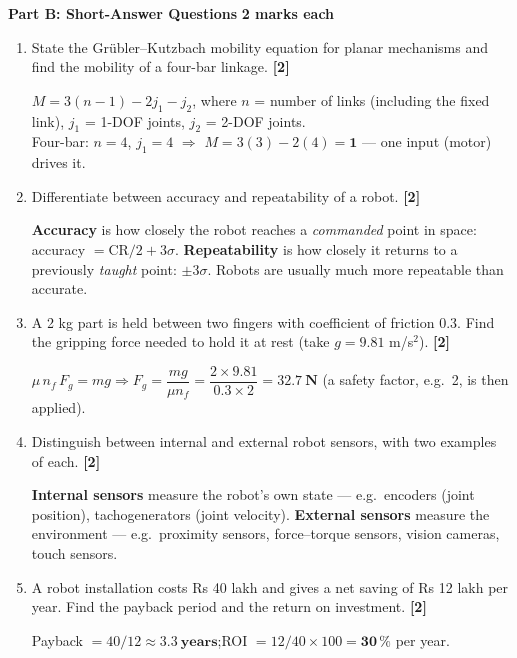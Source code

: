 \documentclass[11pt,a4paper]{article}
\newcommand{\qmarks}[1]{\hfill\textbf{[#1]}}
\newcommand{\partheading}[2]{%
	\bigskip
	\begin{tcolorbox}[colback=cAccent!10, colframe=cAccent, boxrule=0.6pt, arc=2pt, left=6pt, top=3pt, bottom=3pt]
		\textbf{\large #1} \hfill \textbf{#2}
	\end{tcolorbox}}
\begin{document}
	\partheading{Part B: Short-Answer Questions}{2 marks each}
	\begin{enumerate}

		\item State the Gr\"ubler--Kutzbach mobility equation for planar mechanisms and find the mobility of a four-bar linkage. \qmarks{2}
		\begin{answer}
			$M = 3(n-1) - 2j_1 - j_2$, where $n$ = number of links (including the fixed link), $j_1$ = 1-DOF joints, $j_2$ = 2-DOF joints.\\
			Four-bar: $n = 4$, $j_1 = 4$ $\Rightarrow$ $M = 3(3) - 2(4) = \mathbf{1}$ --- one input (motor) drives it.
		\end{answer}

		\item Differentiate between accuracy and repeatability of a robot. \qmarks{2}
		\begin{answer}
			\textbf{Accuracy} is how closely the robot reaches a \emph{commanded} point in space: accuracy $= \text{CR}/2 + 3\sigma$. \textbf{Repeatability} is how closely it returns to a previously \emph{taught} point: $\pm3\sigma$. Robots are usually much more repeatable than accurate.
		\end{answer}

		\item A 2 kg part is held between two fingers with coefficient of friction 0.3. Find the gripping force needed to hold it at rest (take $g = 9.81$ m/s$^2$). \qmarks{2}
		\begin{answer}
			$\mu\,n_f\,F_g = m g \Rightarrow F_g = \dfrac{m g}{\mu n_f} = \dfrac{2\times9.81}{0.3\times2} = \mathbf{32.7\ N}$ (a safety factor, e.g.\ 2, is then applied).
		\end{answer}

		\item Distinguish between internal and external robot sensors, with two examples of each. \qmarks{2}
		\begin{answer}
			\textbf{Internal sensors} measure the robot's own state --- e.g.\ encoders (joint position), tachogenerators (joint velocity). \textbf{External sensors} measure the environment --- e.g.\ proximity sensors, force--torque sensors, vision cameras, touch sensors.
		\end{answer}

		\item A robot installation costs Rs 40 lakh and gives a net saving of Rs 12 lakh per year. Find the payback period and the return on investment. \qmarks{2}
		\begin{answer}
			Payback $= 40/12 \approx \mathbf{3.3\ years}$;\quad ROI $= 12/40\times100 = \mathbf{30\,\%}$ per year.
		\end{answer}

	\end{enumerate}
\end{document}
